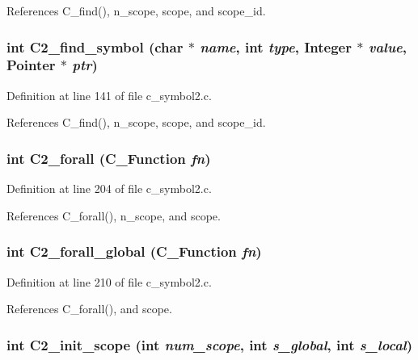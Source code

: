 References C\_\-find(), n\_\-scope, scope, and scope\_\-id.
\subsubsection{\setlength{\rightskip}{0pt plus 5cm}int C2\_\-find\_\-symbol (char $\ast$ {\em name}, int {\em type}, \bf{Integer} $\ast$ {\em value}, \bf{Pointer} $\ast$ {\em ptr})}\label{c__symbol2_8h_e9d0d86d97adc2c75d662f070cc39f6b}




Definition at line 141 of file c\_\-symbol2.c.

References C\_\-find(), n\_\-scope, scope, and scope\_\-id.
\subsubsection{\setlength{\rightskip}{0pt plus 5cm}int C2\_\-forall (\bf{C\_\-Function} {\em fn})}\label{c__symbol2_8h_816569187eee3bb41af18b008426f2a5}




Definition at line 204 of file c\_\-symbol2.c.

References C\_\-forall(), n\_\-scope, and scope.
\subsubsection{\setlength{\rightskip}{0pt plus 5cm}int C2\_\-forall\_\-global (\bf{C\_\-Function} {\em fn})}\label{c__symbol2_8h_c46d4d43a915430a8c369672dcb86093}




Definition at line 210 of file c\_\-symbol2.c.

References C\_\-forall(), and scope.
\subsubsection{\setlength{\rightskip}{0pt plus 5cm}int C2\_\-init\_\-scope (int {\em num\_\-scope}, int {\em s\_\-global}, int {\em s\_\-local})}\label{c__symbol2_8h_4bb831b4735b9acdd8bd65ef83b28354}




